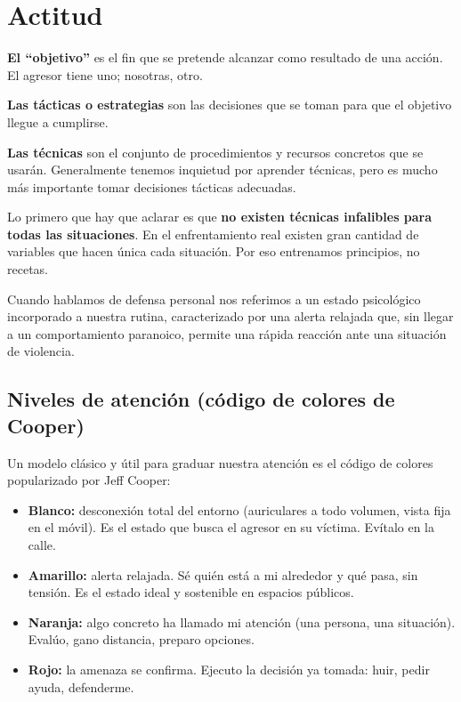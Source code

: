 \chapter{Actitud}

\begin{definicion}
\textbf{El \enquote{objetivo}} es el fin que se pretende alcanzar como resultado de una acción. El agresor tiene uno; nosotras, otro.

\medskip
\textbf{Las tácticas o estrategias} son las decisiones que se toman para que el objetivo llegue a cumplirse.

\medskip
\textbf{Las técnicas} son el conjunto de procedimientos y recursos concretos que se usarán. Generalmente tenemos inquietud por aprender técnicas, pero es mucho más importante tomar decisiones tácticas adecuadas.
\end{definicion}

Lo primero que hay que aclarar es que \textbf{no existen técnicas infalibles para todas las situaciones}. En el enfrentamiento real existen gran cantidad de variables que hacen única cada situación. Por eso entrenamos principios, no recetas.

Cuando hablamos de defensa personal nos referimos a un estado psicológico incorporado a nuestra rutina, caracterizado por una alerta relajada que, sin llegar a un comportamiento paranoico, permite una rápida reacción ante una situación de violencia.

\section{Niveles de atención (código de colores de Cooper)}

Un modelo clásico y útil para graduar nuestra atención es el código de colores popularizado por Jeff Cooper:

\begin{itemize}
  \item \textbf{Blanco:} desconexión total del entorno (auriculares a todo volumen, vista fija en el móvil). Es el estado que busca el agresor en su víctima. Evítalo en la calle.
  \item \textbf{Amarillo:} alerta relajada. Sé quién está a mi alrededor y qué pasa, sin tensión. Es el estado ideal y sostenible en espacios públicos.
  \item \textbf{Naranja:} algo concreto ha llamado mi atención (una persona, una situación). Evalúo, gano distancia, preparo opciones.
  \item \textbf{Rojo:} la amenaza se confirma. Ejecuto la decisión ya tomada: huir, pedir ayuda, defenderme.
\end{itemize}

